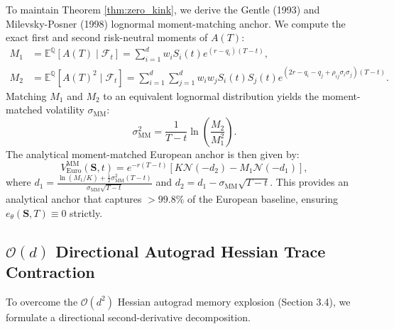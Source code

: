 \documentclass[11pt,a4paper]{article}
\begin{document}
To maintain Theorem \ref{thm:zero_kink}, we derive the Gentle (1993) \cite{gentle1993basket} and Milevsky-Posner (1998) \cite{milevsky1998valuing} lognormal moment-matching anchor. We compute the exact first and second risk-neutral moments of $A(T)$:
\begin{align}
\label{eq:moment_1}
M_1 &= \mathbb{E}^\mathbb{Q}[A(T) \mid \mathcal{F}_t] = \sum_{i=1}^d w_i S_i(t) e^{(r - q_i)(T-t)}, \\
\label{eq:moment_2}
M_2 &= \mathbb{E}^\mathbb{Q}[A(T)^2 \mid \mathcal{F}_t] = \sum_{i=1}^d \sum_{j=1}^d w_i w_j S_i(t) S_j(t) e^{\left(2r - q_i - q_j + \rho_{ij}\sigma_i\sigma_j\right)(T-t)}.
\end{align}
Matching $M_1$ and $M_2$ to an equivalent lognormal distribution yields the moment-matched volatility $\sigma_{\text{MM}}$:
\begin{equation}
\label{eq:sigma_mm}
\sigma_{\text{MM}}^2 = \frac{1}{T-t} \ln\left( \frac{M_2}{M_1^2} \right).
\end{equation}
The analytical moment-matched European anchor is then given by:
\begin{equation}
\label{eq:arith_euro_anchor}
V_{\text{Euro}}^{\text{MM}}(\mathbf{S}, t) = e^{-r(T-t)} \left[ K \mathcal{N}(-d_2) - M_1 \mathcal{N}(-d_1) \right],
\end{equation}
where $d_1 = \frac{\ln(M_1/K) + \frac{1}{2}\sigma_{\text{MM}}^2(T-t)}{\sigma_{\text{MM}}\sqrt{T-t}}$ and $d_2 = d_1 - \sigma_{\text{MM}}\sqrt{T-t}$. This provides an analytical anchor that captures $>99.8\%$ of the European baseline, ensuring $e_\theta(\mathbf{S}, T) \equiv 0$ strictly.

\subsection{\texorpdfstring{$\mathcal{O}(d)$}{O(d)} Directional Autograd Hessian Trace Contraction}
To overcome the $\mathcal{O}(d^2)$ Hessian autograd memory explosion (Section 3.4), we formulate a directional second-derivative decomposition.
\end{document}

